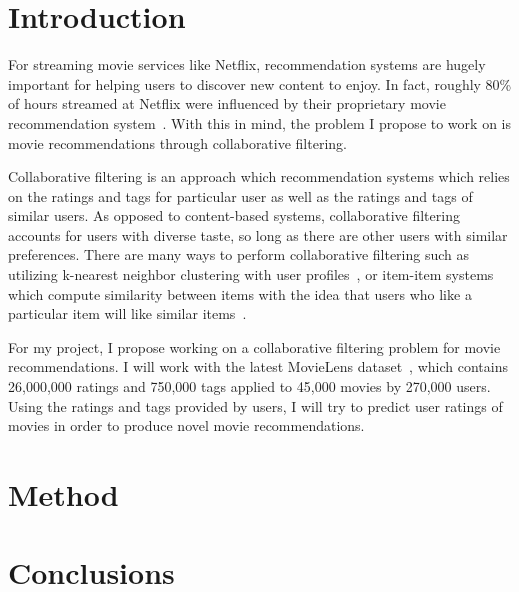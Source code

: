 \documentclass[12pt]{article}
\title{}
\date{}
\begin{document}
\maketitle


\section{Introduction}

For streaming movie services like Netflix, recommendation systems are hugely
important for helping users to discover new content to enjoy.
In fact, roughly 80\% of hours streamed at Netflix were influenced by their
proprietary movie recommendation system~\cite{netflix}.
With this in mind, the problem I propose to work on is movie recommendations
through collaborative filtering.

Collaborative filtering is an approach which recommendation systems which
relies on the ratings and tags for particular user as well as the ratings and
tags of similar users.
As opposed to content-based systems, collaborative filtering accounts for
users with diverse taste, so long as there are other users with similar
preferences.
There are many ways to perform collaborative filtering such as utilizing
k-nearest neighbor clustering with user profiles~\cite{user-user}, or
item-item systems which compute similarity between items with the idea that
users who like a particular item will like similar items~\cite{item-item}.

For my project, I propose working on a collaborative filtering problem for
movie recommendations.
I will work with the latest MovieLens dataset~\cite{movielens},
which contains 26,000,000 ratings and 750,000 tags applied to 45,000 movies by
270,000 users.
Using the ratings and tags provided by users, I will try to predict user
ratings of movies in order to produce novel movie recommendations.

\section{Method}

\section{Conclusions}



\end{document}
